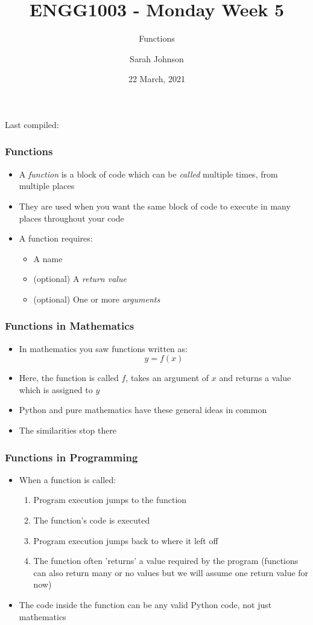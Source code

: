 \documentclass[english,14pt]{beamer}
\title{ENGG1003 - Monday Week 5}
\subtitle{Functions}
\author{Sarah Johnson}
\institute{University of Newcastle}
\date{22 March, 2021}
\begin{document}
\begin{flushleft}
{\scriptsize Last compiled:~\DTMnow}
\vspace*{-5mm}
\end{flushleft}
\framebreak



\begin{frame}
\frametitle{Functions}
\begin{itemize}
\item A \textit{function} is a block of code which can be \textit{called} multiple times, from multiple places
\item They are used when you want the same block of code to execute in many places throughout your code
\item A function requires:
	\begin{itemize}
		\item A name
		\item (optional) A \textit{return value}
		\item (optional) One or more \textit{arguments}
	\end{itemize}
\end{itemize}
\end{frame}

\begin{frame}
\frametitle{Functions in Mathematics}
\begin{itemize}
\item In mathematics you saw functions written as:
\begin{equation*}
y = f(x)
\end{equation*}
\item Here, the function is called $f$, takes an argument of $x$ and returns a value which is assigned to $y$
\item Python and pure mathematics have these general ideas in common
\pause
\item The similarities stop there
\end{itemize}
\end{frame}

\begin{frame}[fragile]
\frametitle{Functions in Programming}
\begin{itemize}
\item When a function is called:
	\begin{enumerate}
		\item Program execution jumps to the function
		\item The function's code is executed
		\item Program execution jumps back to where it left off
		\item The function often 'returns' a value required by the program
		(functions can also return many or no values but we will assume one return value for now)
	\end{enumerate}
\item The code inside the function can be any valid Python code, not just mathematics
\end{itemize}
\end{frame}
\end{document}
